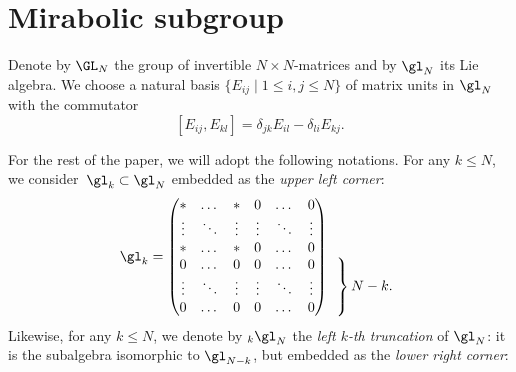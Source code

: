 	\section{Mirabolic subgroup}
	\label{sect::mirabolic}
	
	Denote by $\GL_N$ the group of invertible $N\times N$-matrices and by $\gl_N$ its Lie algebra. We choose a natural basis $\{E_{ij} \mid 1 \leq i,j \leq N\}$ of matrix units in $\gl_N$ with the commutator
	\[
	[E_{ij}, E_{kl}] = \delta_{jk} E_{il} - \delta_{li} E_{kj}.
	\]
	
	For the rest of the paper, we will adopt the following notations. For any $k\leq N$, we consider~${\gl_k \subset \gl_N}$ embedded as the \emph{upper left corner}:
	\[
	\gl_k = \begin{pmatrix}
		* & \dots & * & 0 & \dots & 0 \\
		\vdots & \ddots & \vdots & \vdots & \ddots & \vdots \\
		* & \dots & * & 0 & \dots & 0 \\
		0 & \dots & 0 & 0 & \dots & 0 \\
		\vdots & \ddots & \vdots & \vdots & \ddots & \vdots \\
		0 & \dots & 0 & 0 & \dots & 0
	\end{pmatrix}
	\begin{array}{ c }
		\vphantom{\begin{array}{ c }
				b_N \\ %
				\vdots \\ %
				z_N %
		\end{array}} \\
		\left.\kern-\nulldelimiterspace
		\vphantom{\begin{array}{ c }
				b_N \\ %
				\vdots \\ %
				z_N %
		\end{array}}
		\right\}\text{$N-k.$}
	\end{array}
	\]
	Likewise, for any $k \leq N$, we denote by ${}_k \gl_N$ the \emph{left $k$-th truncation} of $\gl_N$: it is the subalgebra isomorphic to $\gl_{N-k}$, but embedded as the \emph{lower right corner}:
